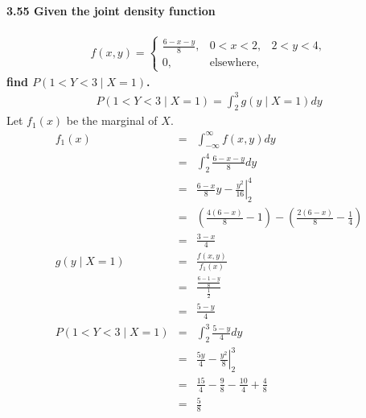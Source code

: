 \documentclass{article}
\begin{document}
\paragraph{3.55 Given the joint density function}
\begin{eqnarray*}
f(x,y) = \left\{ \begin{array}{lll}
	\frac{6-x-y}{8}, & 0<x<2, & 2<y<4,\\
	0, & \mbox{elsewhere,}
	\end{array} \right.
\end{eqnarray*}
\textbf{find $P(1<Y<3 \mid X=1)$.}
\begin{eqnarray*}
P(1<Y<3 \mid X=1) = \int_2^3 g(y \mid X=1)dy
\end{eqnarray*}
Let $f_1(x)$ be the marginal of $X$.
\begin{eqnarray*}
f_1(x) & = & \int_{-\infty}^\infty f(x,y)dy\\
	& = & \int_2^4 \frac{6-x-y}{8}dy\\
	& = & \left. \frac{6-x}{8}y-\frac{y^2}{16} \right|_2^4\\
	& = & \left( \frac{4(6-x)}{8}-1\right)-
		\left(\frac{2(6-x)}{8}-\frac{1}{4}\right)\\
	& = & \frac{3-x}{4}\\
g(y\mid X=1) & = & \frac{f(x,y)}{f_1(x)}\\
	& = & \frac{\frac{6-1-y}{8}}{\frac{1}{2}}\\
	& = & \frac{5-y}{4}\\
P(1<Y<3\mid X=1) & = & \int_2^3 \frac{5-y}{4}dy\\
	& = & \left. \frac{5y}{4}-\frac{y^2}{8}\right|_2^3\\
	& = & \frac{15}{4}-\frac{9}{8}-\frac{10}{4}+\frac{4}{8}\\
	& = & \frac{5}{8}
\end{eqnarray*}
\end{document}
